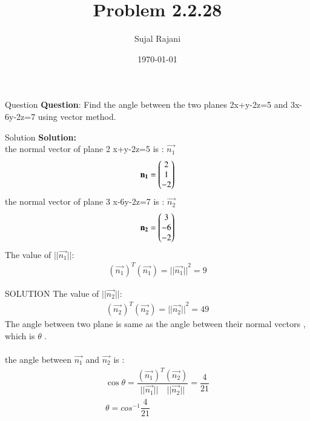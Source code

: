 \documentclass{beamer}
\title{Problem 2.2.28}
\author{Sujal Rajani}
\date{\today}
\begin{document}
\begin{frame}
\titlepage
\end{frame}



\begin{frame}{Question}
\textbf{Question}:
\noindent Find the angle between the two planes 2x+y-2z=5 and 3x-6y-2z=7 using vector method.
\end{frame}

\begin{frame}{Solution}
\textbf{Solution:} 
\\
 the   normal vector of plane 2 x+y-2z=5 is : $\vec{n_1}$
 \begin{align*}
     \mathbf{n_1}=\begin{pmatrix}2\\1\\-2\end{pmatrix}
 \end{align*}
 the normal vector of plane 3 x-6y-2z=7 is : $\vec{n_2}$
 \begin{align*}
     \mathbf{n_2}=\begin{pmatrix}3\\-6\\-2\end{pmatrix}
 \end{align*} 
 The value of $||\vec{n_1}||$:
  \begin{align*}
     (\vec{n_1})^T(\vec{n_1})={||\vec{n_1}||}^2=9
 \end{align*}
 \end{frame} 
 
 \begin{frame}{SOLUTION}
 The value of $||\vec{n_2}||$:
  \begin{align*}
     (\vec{n_2} )^T(\vec{n_2})={||\vec{n_2}||}^2=49
 \end{align*}
 The angle between two plane is same as the angle between their normal vectors , which is  $\theta$ .
\\
\\
 the angle between $\vec{n_1}$ and $\vec{n_2}$ is :
 \begin{align*}
      \cos{\theta} = \dfrac{(\vec{n_1})^T(\vec{n_2})}{||\vec{n_1}||\quad||\vec{n_2}||}=\dfrac{4}{21}
       \\
      \theta=cos^{-1}\dfrac{4}{21}
 \end{align*}
 \end{frame}
\end{document}
